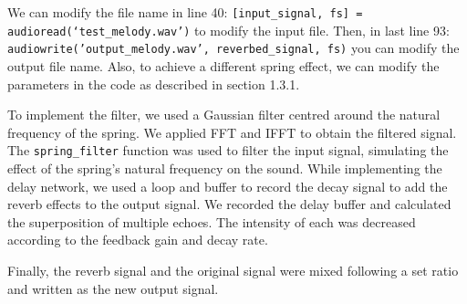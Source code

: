 \documentclass[12pt]{article}
\begin{document}
We can modify the file name in line 40: \texttt{\footnotesize [input\_signal, fs] = audioread(`test\_melody.wav')} to modify the input file. Then, in last line 93: \texttt{\footnotesize audiowrite('output\_melody.wav', reverbed\_signal, fs)} you can modify the output file name.  Also, to achieve a different spring effect, we can modify the parameters in the code as described in section 1.3.1.

To implement the filter, we used a Gaussian filter centred around the natural frequency of the spring. We applied FFT and IFFT to obtain the filtered signal. The \texttt{spring\_filter} function was used to filter the input signal, simulating the effect of the spring's natural frequency on the sound. While implementing the delay network, we used a loop and buffer to record the decay signal to add the reverb effects to the output signal. We recorded the delay buffer and calculated the superposition of multiple echoes. The intensity of each was decreased according to the feedback gain and decay rate. 

Finally, the reverb signal and the original signal were mixed following a set ratio and written as the new output signal. 
\end{document}
